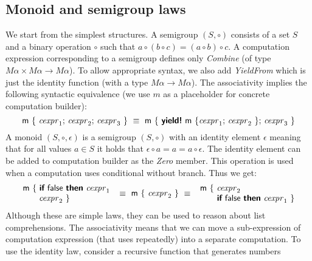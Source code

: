 \documentclass[runningheads,a4paper]{llncs}
\begin{document}

\subsection{Monoid and semigroup laws}
\label{sec:laws-monoids}

We start from the simplest structures. A semigroup $(S, \circ)$ consists of a set
$S$ and a binary operation $\circ$ such that $a \circ (b \circ c) = (a \circ b) \circ c$.
A computation expression corresponding to a semigroup defines only \emph{Combine} (of type
$M\alpha \times M\alpha \rightarrow M\alpha$). To allow appropriate syntax, we also add
\emph{YieldFrom} which is just the identity function (with a type $M\alpha \rightarrow M\alpha$). 
The associativity implies the following syntactic equivalence (we use $m$ as a placeholder
for concrete computation builder):
%
\begin{equation*}
\textnormal{\sffamily m}~\{~\textnormal{\emph{cexpr}}_1; \,\textnormal{\emph{cexpr}}_2; \,\textnormal{\emph{cexpr}}_3 ~\} ~\equiv~
  \textnormal{\sffamily m}~\{~\textnormal{\bfseries\sffamily yield!}~\textnormal{\sffamily m}~\{ \textnormal{\emph{cexpr}}_1; \,\textnormal{\emph{cexpr}}_2 ~\}; \,\textnormal{\emph{cexpr}}_3 ~\}
\end{equation*}
%
A monoid $(S, \circ, \epsilon)$ is a semigroup $(S, \circ)$ with an identity element $\epsilon$ meaning 
that for all values $a\in S$ it holds that $\epsilon \circ a = a = a \circ \epsilon$. The identity
element can be added to computation builder as the \emph{Zero} member. This operation is used when
a computation uses conditional without  branch. Thus we get:
%
\begin{equation*}
\begin{array}{l}
\textnormal{\sffamily m}~\{~  \textnormal{\bfseries\sffamily if}~\textnormal{\sffamily false}~\textnormal{\bfseries\sffamily then}~ \textnormal{\emph{cexpr}}_1\\
\hspace{1.9em} \textnormal{\emph{cexpr}}_2 ~\}
\end{array} 
~\equiv~
\textnormal{\sffamily m}~\{~ \textnormal{\emph{cexpr}}_2 ~\}\\
~\equiv~
\begin{array}{l}
\textnormal{\sffamily m}~\{~  \textnormal{\emph{cexpr}}_2 \\
\hspace{2.0em} \textnormal{\bfseries\sffamily if}~\textnormal{\sffamily false}~\textnormal{\bfseries\sffamily then}~ \textnormal{\emph{cexpr}}_1 ~\}
\end{array}
\end{equation*}
%
Although these are simple laws, they can be used to reason about list comprehensions. The associativity
means that we can move a sub-expression of computation expression (that uses  repeatedly) into a
separate computation. To use the identity law, consider a recursive function that generates numbers
\end{document}
